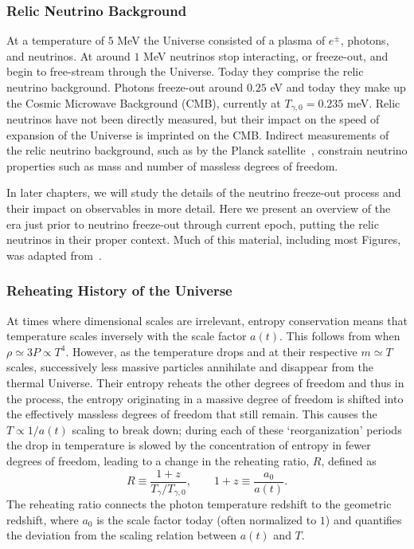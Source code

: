 \subsubsection{Relic Neutrino Background}\label{ch:intro}
At a temperature of $5$ MeV the Universe consisted of a plasma of $e^\pm$, photons, and neutrinos. At around $1$ MeV neutrinos stop interacting, or freeze-out, and begin to free-stream through the Universe. Today they comprise the relic neutrino background. Photons freeze-out around $0.25$ eV and today they make up the Cosmic Microwave Background (CMB), currently at $T_{\gamma,0}=0.235$ meV. Relic neutrinos have not been directly measured, but their impact on the speed of expansion of the Universe is imprinted on the CMB. Indirect measurements of the relic neutrino background, such as by the Planck satellite~\cite{Planck:2018vyg,Planck:2015fie,Planck:2013pxb}, constrain neutrino properties such as mass and number of massless degrees of freedom.

In later chapters, we will study the details of the neutrino freeze-out process and their impact on observables in more detail. Here we present an overview of the era just prior to neutrino freeze-out through current epoch, putting the relic neutrinos in their proper context. Much of this material, including most Figures, was adapted from~\cite{Rafelski:2013yka}.


\subsubsection{Reheating History of the Universe}\label{Eralink}

At times where dimensional scales are irrelevant, entropy conservation means that temperature scales inversely with the scale factor $a(t)$. This follows from  when $ \rho\simeq 3P \propto T^4$. However, as the temperature drops and at their respective $m\simeq T$ scales, successively less massive particles annihilate and disappear from the thermal Universe. Their entropy reheats the other degrees of freedom and thus in the process, the entropy originating in a massive degree of freedom is shifted into the effectively massless degrees of freedom that still remain. This causes the $T\propto 1/a(t)$ scaling to break down; during each of these `reorganization' periods the drop in temperature is slowed by the concentration of entropy in fewer degrees of freedom, leading to a change in the reheating ratio, $R$, defined as
\begin{equation}\label{redshiftratio}
R\equiv \frac{1+z}{ T_\gamma/T_{\gamma,0}}, \qquad 1+z\equiv \frac{a_{0}}{a(t)}.
\end{equation}
The reheating ratio connects the photon temperature redshift to the geometric redshift, where $a_0$ is the scale factor today (often normalized to $1$) and quantifies the deviation from the scaling relation between $a(t)$ and $T$.

